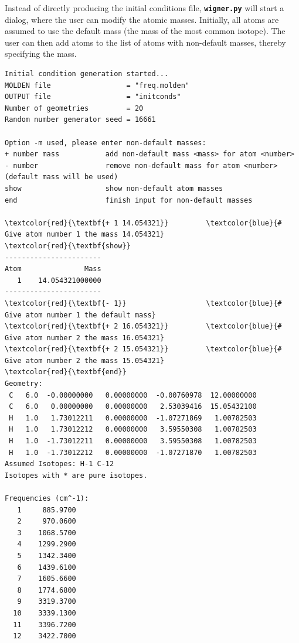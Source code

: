 \documentclass[a4paper,11pt,DIV=15,openany]{scrbook}
\newcommand{\ttt}[1]{\textbf{\texttt{#1}}}
\begin{document}
Instead of directly producing the initial conditions file, \ttt{wigner.py} will start a dialog, where the user can modify the atomic masses. Initially, all atoms are assumed to use the default mass (the mass of the most common isotope). The user can then add atoms to the list of atoms with non-default masses, thereby specifying the mass. 
\begin{oframed}
\footnotesize\begin{Verbatim}[commandchars=\\\{\}]
Initial condition generation started...
MOLDEN file                  = "freq.molden"
OUTPUT file                  = "initconds"
Number of geometries         = 20
Random number generator seed = 16661

Option -m used, please enter non-default masses:
+ number mass           add non-default mass <mass> for atom <number>
- number                remove non-default mass for atom <number> (default mass will be used)
show                    show non-default atom masses
end                     finish input for non-default masses

\textcolor{red}{\textbf{+ 1 14.054321}}         \textcolor{blue}{# Give atom number 1 the mass 14.054321}
\textcolor{red}{\textbf{show}}
-----------------------
Atom               Mass
   1    14.054321000000
-----------------------
\textcolor{red}{\textbf{- 1}}                   \textcolor{blue}{# Give atom number 1 the default mass}
\textcolor{red}{\textbf{+ 2 16.054321}}         \textcolor{blue}{# Give atom number 2 the mass 16.054321}
\textcolor{red}{\textbf{+ 2 15.054321}}         \textcolor{blue}{# Give atom number 2 the mass 15.054321}
\textcolor{red}{\textbf{end}}
Geometry:
 C   6.0  -0.00000000   0.00000000  -0.00760978  12.00000000 
 C   6.0   0.00000000   0.00000000   2.53039416  15.05432100 
 H   1.0   1.73012211   0.00000000  -1.07271869   1.00782503 
 H   1.0   1.73012212   0.00000000   3.59550308   1.00782503 
 H   1.0  -1.73012211   0.00000000   3.59550308   1.00782503 
 H   1.0  -1.73012212   0.00000000  -1.07271870   1.00782503 
Assumed Isotopes: H-1 C-12 
Isotopes with * are pure isotopes.

Frequencies (cm^-1):
   1     885.9700
   2     970.0600
   3    1068.5700
   4    1299.2900
   5    1342.3400
   6    1439.6100
   7    1605.6600
   8    1774.6800
   9    3319.3700
  10    3339.1300
  11    3396.7200
  12    3422.7000

\end{Verbatim}
\end{oframed}
\end{document}
